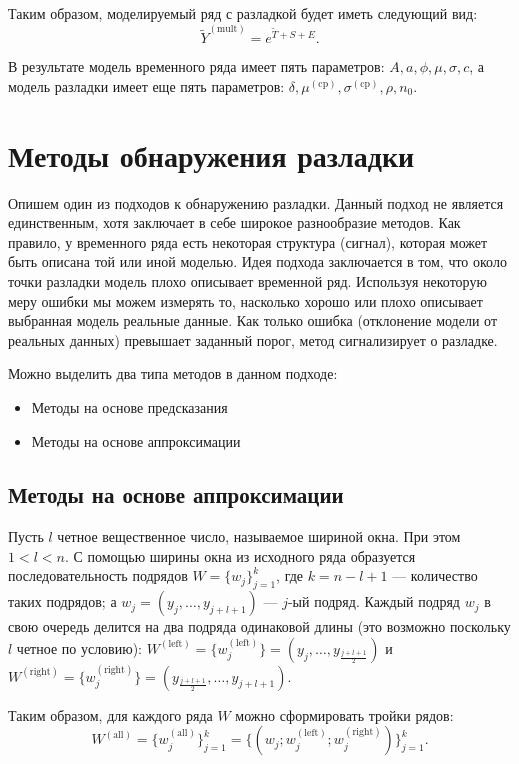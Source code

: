 \documentclass[%
12pt,
master,  %
natbib,      %
subf,        %
substylefile = spbu.rtx,
href,        %
colorlinks,  %
]{disser}
\begin{document}
Таким образом, моделируемый ряд с разладкой будет иметь следующий вид:
$$ \tilde{Y}^{\mathrm{(mult)}} = e^{\tilde{T} + S + E}. $$

В результате модель временного ряда имеет пять параметров: $ A, a, \phi, \mu, \sigma, c $, а модель разладки имеет еще пять параметров: $ \delta, \mu^{\mathrm{(cp)}}, \sigma^{\mathrm{(cp)}}, \rho, n_0 $.

\section{Методы обнаружения разладки}


Опишем один из подходов к обнаружению разладки. Данный подход не является единственным, хотя заключает в себе широкое разнообразие методов. Как правило, у временного ряда есть некоторая структура (сигнал), которая может быть описана той или иной моделью. Идея подхода заключается в том, что около точки разладки модель плохо описывает временной ряд. Используя некоторую меру ошибки мы можем измерять то, насколько хорошо или плохо описывает выбранная модель реальные данные. Как только ошибка (отклонение модели от реальных данных) превышает заданный порог, метод сигнализирует о разладке.

Можно выделить два типа методов в данном подходе:
\begin{itemize}
	\item Методы на основе предсказания
	\item Методы на основе аппроксимации
\end{itemize}

\subsection{Методы на основе аппроксимации}

Пусть $l$ четное вещественное число, называемое шириной окна. При этом  $ 1 < l < n $. С помощью ширины окна из исходного ряда образуется последовательность подрядов $W = \{ w_j \}_{j=1}^k$, где $k = n - l + 1$ --- количество таких подрядов; а $ w_j = (y_j, \dots, y_{j+l+1}) $ --- $j$-ый подряд. Каждый подряд  $w_j$  в свою очередь делится на два подряда одинаковой длины (это возможно поскольку $l$ четное по условию): $ W^{\mathrm{(left)}} = \{w_j^{\mathrm{(left)}} \}  =  (y_j, \dots, y_{\frac{j+l+1}{2}})$ и $W^{\mathrm{(right)}} = \{w_j^{\mathrm{(right)}} \} = (y_{\frac{j+l+1}{2}}, \dots, y_{j+l+1})$.

Таким образом, для каждого ряда $W$ можно сформировать тройки рядов: 
$$ W^{\mathrm{(all)}} = \{w_j^{\mathrm{(all)}} \}_{j=1}^k =  \{(w_j; w_j^{\mathrm{(left)}}; w_j^{\mathrm{(right)}}) \}_{j=1}^k. $$
\end{document}

